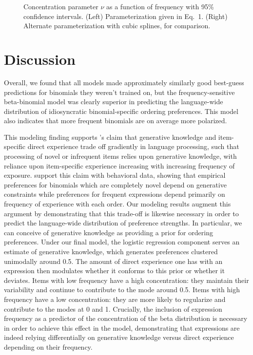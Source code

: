 \documentclass[10pt,letterpaper]{article}
\begin{document}
\begin{figure}[h]
\vspace{-10pt}
\caption{Concentration parameter $\nu$ as a function of frequency with 95\% confidence intervals. (Left) Parameterization given in Eq.\ 1. (Right) Alternate parameterization with cubic splines, for comparison.}
\label{fig:nu}
\end{figure}

\section{Discussion}
Overall, we found that all models made approximately similarly good best-guess predictions for binomials they weren't trained on, but the frequency-sensitive beta-binomial model was clearly superior in predicting the language-wide distribution of idiosyncratic binomial-specific ordering preferences. This model also indicates that more frequent binomials are on average more polarized.

This modeling finding supports \citet{Morgan:uMm0l0Ja}'s claim that generative knowledge and item-specific direct experience trade off gradiently in language processing, such that processing of novel or infrequent items relies upon generative knowledge, with reliance upon item-specific experience increasing with increasing frequency of exposure. \citeauthor{Morgan:uMm0l0Ja} support this claim with behavioral data, showing that empirical preferences for binomials which are completely novel depend on generative constraints while preferences for frequent expressions depend primarily on frequency of experience with each order. Our modeling results augment this argument by demonstrating that this trade-off is likewise necessary in order to predict the language-wide distribution of preference strengths. In particular, we can conceive of generative knowledge as providing a prior for ordering preferences. Under our final model, the logistic regression component serves an estimate of generative knowledge, which generates preferences clustered unimodally around 0.5. The amount of direct experience one has with an expression then modulates whether it conforms to this prior or whether it deviates. Items with low frequency have a high concentration: they maintain their variability and continue to contribute to the mode around 0.5. Items with high frequency have a low concentration: they are more likely to regularize and contribute to the modes at 0 and 1. Crucially, the inclusion of expression frequency as a predictor of the concentration of the beta distribution is necessary in order to achieve this effect in the model, demonstrating that expressions are indeed relying differentially on generative knowledge versus direct experience depending on their frequency.
\end{document}
